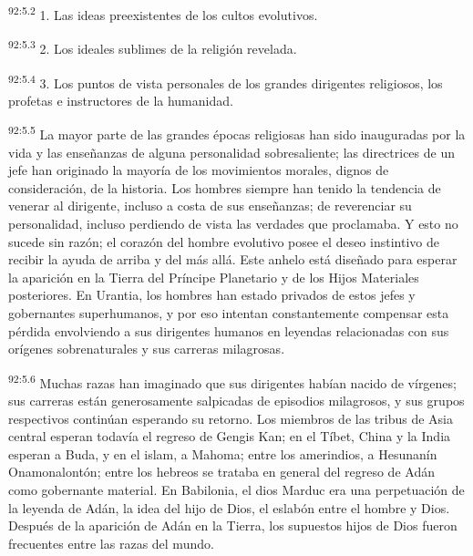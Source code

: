 \par
\textsuperscript{92:5.2} 1. Las ideas preexistentes de los cultos evolutivos.

\par
\textsuperscript{92:5.3} 2. Los ideales sublimes de la religión revelada.

\par
\textsuperscript{92:5.4} 3. Los puntos de vista personales de los grandes dirigentes religiosos, los profetas e instructores de la humanidad.

\par
\textsuperscript{92:5.5} La mayor parte de las grandes épocas religiosas han sido inauguradas por la vida y las enseñanzas de alguna personalidad sobresaliente; las directrices de un jefe han originado la mayoría de los movimientos morales, dignos de consideración, de la historia. Los hombres siempre han tenido la tendencia de venerar al dirigente, incluso a costa de sus enseñanzas; de reverenciar su personalidad, incluso perdiendo de vista las verdades que proclamaba. Y esto no sucede sin razón; el corazón del hombre evolutivo posee el deseo instintivo de recibir la ayuda de arriba y del más allá. Este anhelo está diseñado para esperar la aparición en la Tierra del Príncipe Planetario y de los Hijos Materiales posteriores. En Urantia, los hombres han estado privados de estos jefes y gobernantes superhumanos, y por eso intentan constantemente compensar esta pérdida envolviendo a sus dirigentes humanos en leyendas relacionadas con sus orígenes sobrenaturales y sus carreras milagrosas.

\par
\textsuperscript{92:5.6} Muchas razas han imaginado que sus dirigentes habían nacido de vírgenes; sus carreras están generosamente salpicadas de episodios milagrosos, y sus grupos respectivos continúan esperando su retorno. Los miembros de las tribus de Asia central esperan todavía el regreso de Gengis Kan; en el Tíbet, China y la India esperan a Buda, y en el islam, a Mahoma; entre los amerindios, a Hesunanín Onamonalontón; entre los hebreos se trataba en general del regreso de Adán como gobernante material. En Babilonia, el dios Marduc era una perpetuación de la leyenda de Adán, la idea del hijo de Dios, el eslabón entre el hombre y Dios. Después de la aparición de Adán en la Tierra, los supuestos hijos de Dios fueron frecuentes entre las razas del mundo.

